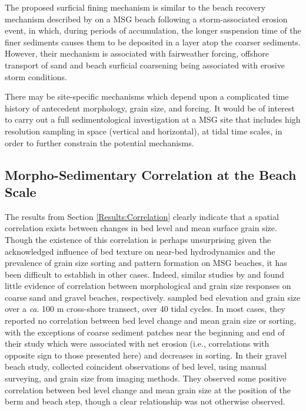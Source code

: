 \documentclass[preprint,12pt,authoryear]{elsarticle}
\begin{document}
The proposed surficial fining mechanism is similar to the beach recovery mechanism described by \citet{Bramato_etal2012} on a MSG beach following a storm-associated erosion event, in which, during periods of accumulation, the longer suspension time of the finer sediments causes them to be deposited in a layer atop the coarser sediments. However, their mechanism is associated with fairweather forcing, offshore transport of sand and beach surficial coarsening being associated with erosive storm conditions.

There may be site-specific mechanisms which depend upon a complicated time history of antecedent morphology, grain size, and forcing. It would be of interest to carry out a full sedimentological investigation at a MSG site that includes high resolution sampling in space (vertical and horizontal), at tidal time scales, in order to further constrain the potential mechanisms.


\subsection{Morpho-Sedimentary Correlation at the Beach Scale}\label{Discussion:Correlation}

The results from Section \ref{Results:Correlation} clearly indicate that a spatial correlation exists between changes in bed level and mean surface grain size. Though the existence of this correlation is perhaps unsurprising given the acknowledged influence of bed texture on near-bed hydrodynamics and the prevalence of grain size sorting and pattern formation on MSG beaches, it has been difficult to establish in other cases. Indeed, similar studies by \citet{Masselink_etal2007} and \citet{Austin_Buscombe2008} found little evidence of correlation between morphological and grain size responses on coarse sand and gravel beaches, respectively. \citeauthor{Masselink_etal2007} sampled bed elevation and grain size over a \textit{ca}. 100 m cross-shore transect, over 40 tidal cycles. In most cases, they reported no correlation between bed level change and mean grain size or sorting, with the exceptions of coarse sediment patches near the beginning and end of their study which were associated with net erosion (i.e., correlations with opposite sign to those presented here) and decreases in sorting. In their gravel beach study, \citet{Austin_Buscombe2008} collected coincident observations of bed level, using manual surveying, and grain size from imaging methods. They observed some positive correlation between bed level change and mean grain size at the position of the berm and beach step, though a clear relationship was not otherwise observed. 
\end{document}
